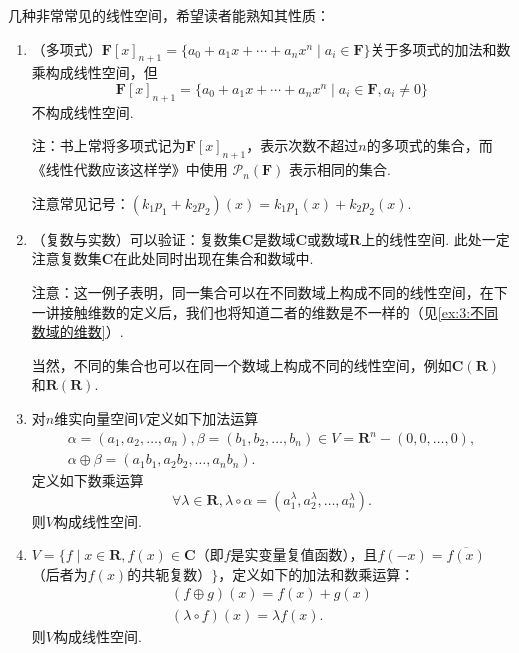 \begin{example}
    几种非常常见的线性空间，希望读者能熟知其性质：
    \begin{enumerate}
        \item （多项式）$\mathbf{F}[x]_{n+1}=\{a_0+a_1x+\cdots+a_nx^n \mid a_i\in\mathbf{F}\}$关于多项式的加法和数乘构成线性空间，但
              \[\mathbf{F}[x]_{n+1}=\{a_0+a_1x+\cdots+a_nx^n \mid a_i\in\mathbf{F},a_i\neq 0\}\]
              不构成线性空间.

              注：书上常将多项式记为$\mathbf{F}[x]_{n+1}$，表示次数不超过$n$的多项式的集合，而《线性代数应该这样学》中使用 $\mathcal{P}_n(\mathbf{F})$ 表示相同的集合.

              注意常见记号：$(k_1p_1+k_2p_2)(x)=k_1p_1(x)+k_2p_2(x)$.

        \item （复数与实数）可以验证：复数集$\mathbf{C}$是数域$\mathbf{C}$或数域$\mathbf{R}$上的线性空间. 此处一定注意复数集$\mathbf{C}$在此处同时出现在集合和数域中.

              注意：这一例子表明，同一集合可以在不同数域上构成不同的线性空间，在下一讲接触维数的定义后，我们也将知道二者的维数是不一样的（见\autoref{ex:3:不同数域的维数}）.

              当然，不同的集合也可以在同一个数域上构成不同的线性空间，例如$\mathbf{C(R)}$和$\mathbf{R(R)}$.

        \item 对$n$维实向量空间$V$定义如下加法运算
        \begin{gather*}
            \alpha = (a_1, a_2, \ldots, a_n), \beta = (b_1, b_2, \ldots, b_n) \in V = \mathbf{R}^n - (0, 0, \ldots, 0), \\ \alpha \oplus \beta = (a_1b_1, a_2b_2, \ldots, a_nb_n).
        \end{gather*}
        定义如下数乘运算
        \[\forall \lambda \in \mathbf{R}, \lambda \circ \alpha = (a_1^\lambda, a_2^\lambda, \ldots, a_n^\lambda).\]
        则$V$构成线性空间.

        \item $V=\{f \mid x \in \mathbf{R}, f(x) \in \mathbf{C}$（即$f$是实变量复值函数），且$f(-x)=\overline{f(x)}$（后者为$f(x)$的共轭复数）$\}$，定义如下的加法和数乘运算：
        \begin{gather*}
            (f \oplus g)(x) = f(x) + g(x) \\
            (\lambda \circ f)(x) = \lambda f(x).
        \end{gather*}
        则$V$构成线性空间.
    \end{enumerate}
\end{example}

